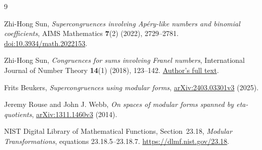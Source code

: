 \documentclass[11pt,a4paper]{article}
\theoremstyle{remark}\newtheorem{remark}[theorem]{Remark}
\begin{document}
\begingroup\small
\begin{thebibliography}{9}
\raggedright
{}
Zhi-Hong Sun,
\emph{Supercongruences involving Ap\'ery-like numbers and binomial coefficients},
AIMS Mathematics \textbf{7}(2) (2022), 2729--2781.
\href{https://doi.org/10.3934/math.2022153}{doi:10.3934/math.2022153}.

Zhi-Hong Sun,
\emph{Congruences for sums involving Franel numbers},
International Journal of Number Theory \textbf{14}(1) (2018), 123--142.
\href{https://maths.hytc.edu.cn/__local/3/45/77/77F7497DDFD531E8688ED13C0D0_262306C8_24EB4.pdf}{Author's full text}.

Frits Beukers,
\emph{Supercongruences using modular forms},
\href{https://arxiv.org/abs/2403.03301v3}{arXiv:2403.03301v3} (2025).

Jeremy Rouse and John J. Webb,
\emph{On spaces of modular forms spanned by eta-quotients},
\href{https://arxiv.org/abs/1311.1460v3}{arXiv:1311.1460v3} (2014).

NIST Digital Library of Mathematical Functions,
Section~23.18, \emph{Modular Transformations}, equations 23.18.5--23.18.7.
\url{https://dlmf.nist.gov/23.18}.
\end{thebibliography}
\endgroup
\end{document}
